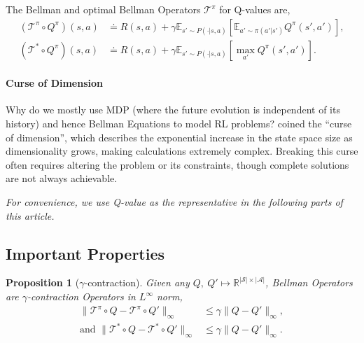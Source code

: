 \documentclass{article} %
\newcommand{\bellman}{\mathcal{T}^\pi}
\newcommand{\bellmanopt}{\mathcal{T}^*}
\newtheorem{proposition}{Proposition}
\begin{document}
The Bellman and optimal Bellman Operators $\bellman$ for Q-values are,
\begin{equation}
	\begin{aligned}
    (\bellman \circ Q^\pi)(s, a) &\doteq R(s, a) + \gamma \mathbb{E}_{s' \sim P(\cdot|s,a)} \left[ \mathbb{E}_{a' \sim \pi(a'|s')} Q^\pi(s', a') \right],  \\
    (\bellmanopt \circ Q^\pi)(s, a) &\doteq R(s, a) + \gamma \mathbb{E}_{s' \sim P(\cdot|s,a)} \left[ \max_{a'} Q^\pi(s', a') \right].
\end{aligned} 
\end{equation}

\paragraph{Curse of Dimension}

Why do we mostly use MDP (where the future evolution is independent of its history) and hence Bellman Equations to model RL problems? \cite{bellman1957dynamic} coined the ``curse of dimension'', which describes the exponential increase in the state space size as dimensionality grows, making calculations extremely complex. Breaking this curse often requires altering the problem or its constraints, though complete solutions are not always achievable.

\textit{For convenience, we use Q-value as the representative in the following parts of this article.}

\subsection{Important Properties}

\begin{proposition} [$\gamma$-contraction]
	Given any $Q,\ Q' \mapsto \mathbb{R}^{|\mathcal{S}| \times |\mathcal{A}|}$, Bellman Operators are $\gamma$-contraction Operators in $L^\infty$ norm,
	\begin{equation}
	\begin{aligned}
		\|\mathcal{T}^\pi \circ Q - \mathcal{T}^\pi \circ Q'\|_\infty &\leqslant \gamma \|Q-Q'\|_\infty,\\
		\text{and }\|\mathcal{T}^* \circ Q - \mathcal{T}^* \circ Q'\|_\infty &\leqslant \gamma \|Q-Q'\|_\infty.
	\end{aligned}
	\end{equation}
\end{proposition}
\end{document}
